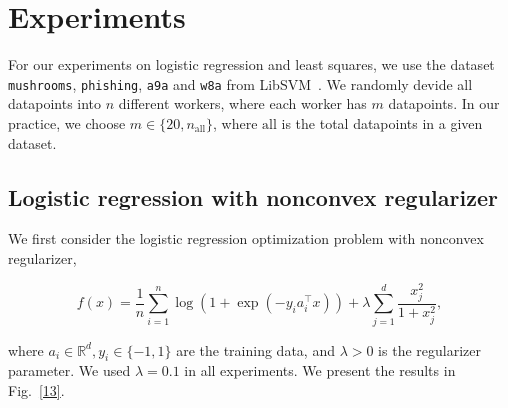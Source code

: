 \documentclass{article} %
\newcommand{\algname}[1]{{\sf\green\relscale{0.90}#1}\xspace}
\theoremstyle{plain}
\newtheorem{theorem}{Theorem}[section]
\theoremstyle{definition}
\theoremstyle{remark}
\newcommand{\green}{\color{mydarkgreen}}
\begin{document}

   

   

\section{Experiments}
For our experiments on logistic regression and least squares, we use the dataset \texttt{mushrooms}, \texttt{phishing}, \texttt{a9a} and \texttt{w8a} from LibSVM~\cite{chang2011libsvm}. We randomly devide all datapoints into $n$ different workers, where each worker has $m$ datapoints. In our practice, we choose $m \in \{20, n_{\mathrm{all}}\}$, where $\mathrm{all}$ is the total datapoints in a given dataset. 

\subsection{Logistic regression with nonconvex regularizer}
We first consider the logistic regression optimization problem with nonconvex regularizer, 

\begin{equation}
   f(x)=\frac{1}{n} \sum_{i=1}^{n} \log \left(1+\exp \left(-y_{i} a_{i}^{\top} x\right)\right)+\lambda \sum_{j=1}^{d} \frac{x_{j}^{2}}{1+x_{j}^{2}}, 
\end{equation}

where $a_{i} \in \mathbb{R}^{d}, y_{i} \in\{-1,1\}$ are the training data, and $\lambda>0$ is the regularizer parameter. We used $\lambda=0.1$ in all experiments. We present the results in Fig.~\ref{13}.
\end{document}
